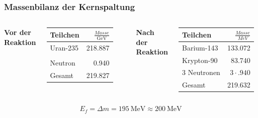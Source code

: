 \documentclass{beamer}[9pt]
\begin{document}
\begin{frame}
\frametitle{Massenbilanz der Kernspaltung}

\centering
\begin{columns}
\centering
{}


\textbf{Vor der Reaktion}

\vspace*{0.5cm}
\begin{tabular}{lr}
\toprule
	Teilchen & $\frac{Masse}{\si{\giga\eV}}$ \\
\midrule	
	Uran-235 & \num{218.887}\\
	\\
	Neutron & \num{.940}\\
	\midrule
	Gesamt & 219.827\\
	\bottomrule
	
\end{tabular}

\centering
\textbf{Nach der Reaktion}

\vspace*{0.5cm}
\begin{tabular}{lr}
\toprule
	Teilchen & $\frac{Masse}{MeV}$ \\
\midrule	
	Barium-143 & \num{133.072}\\
	Krypton-90 & \num{83.740}\\
	3 Neutronen & $3 \cdot\num{.940}$\\ 
	\midrule
	Gesamt & \num{219.632}\\
	\bottomrule
\end{tabular}
\end{columns}
\vspace{0.5cm}
\[
E_f = \Delta m = \SI{195}{\MeV} \approx  \SI{200}{\MeV} 
\]
\end{frame}
\end{document}
